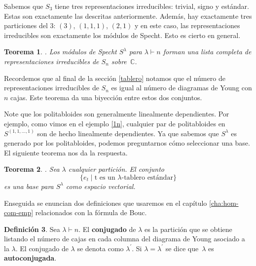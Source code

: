 \documentclass[12pt]{book}
\newtheorem{theorem}{Teorema}[section]
\newtheorem{corollary}[theorem]{Corolario}
\theoremstyle{definition}
\newtheorem{definition}[theorem]{Definición}
\newcounter{in}
\newcounter{ini}
\begin{document}
Sabemos que $S_{3}$ tiene tres representaciones irreducibles: trivial,
signo y estándar. Estas son exactamente las descritas anteriormente. Además,
hay exactamente tres particiones del $3$: $(3)$, $(1,1,1)$,
$(2,1)$ y en este caso, las representaciones irreducibles son
exactamente los módulos de Specht. Esto es cierto en general.

\begin{theorem}{}.
  Los módulos de Specht $S^{\lambda}$ para $\lambda\vdash n$ forman
  una lista completa de representaciones irreducibles de $S_{n}$ sobre~$\mathbb{C}$.
  \label{todas-repr-irre}
\end{theorem}
Recordemos que al final de la sección \ref{tablero} notamos que el
número de representaciones irreducibles de $S_{n}$ es igual al número
de diagramas de Young con $n$ cajas. Este teorema da una biyección
entre estos dos conjuntos.

Note que los politabloides son generalmente linealmente dependientes. Por
ejemplo, como vimos en el ejemplo \ref{1n}, cualquier par de
politabloides en $S^{(1,1,\ldots,1)}$ son de hecho linealmente
dependientes. Ya que sabemos que $S^{\lambda}$ es generado por los
politabloides, podemos preguntarnos cómo seleccionar una base. El
siguiente teorema nos da la respuesta.

\begin{theorem}{}.
  \label{base-S}
  Sea $\lambda$ cualquier partición. El conjunto
  \begin{equation*}
    \{e_{t}\mid \mbox{t es un $\lambda$-tablero estándar}\}
  \end{equation*}
  es una base para $S^{\lambda}$ como espacio vectorial.
\end{theorem}
Enseguida se enuncian dos definiciones que usaremos en el capítulo \ref{cha:hom-com-emp}
relacionados con la fórmula de Bouc.

\begin{definition}
  Sea $\lambda\vdash n$. El \textbf{conjugado} de $\lambda$ es la
  partición que se obtiene listando el número de cajas en cada columna
  del diagrama de Young asociado a la $\lambda$. El conjugado de
  $\lambda$ se denota como $\lambda^{'}$. Si $\lambda=\lambda^{'}$ se
  dice que~$\lambda$ es \textbf{autoconjugada}.
\end{definition}
\end{document}
